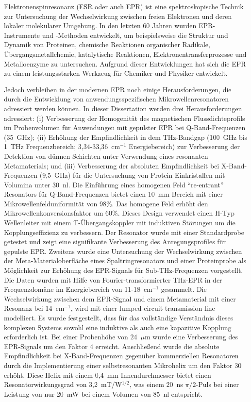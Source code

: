 \vspace{-2em}
Elektronenspinresonanz (ESR oder auch EPR) ist eine spektroskopische Technik zur Untersuchung der Wechselwirkung zwischen freien Elektronen und deren lokaler molekularer Umgebung. In den letzten 60 Jahren wurden EPR-Instrumente und -Methoden entwickelt, um beispielsweise die Struktur und Dynamik von Proteinen, chemische Reaktionen organischer Radikale, Übergangsmetallchemie, katalytische Reaktionen, Elektronentransferprozesse und Metalloenzyme zu untersuchen. Aufgrund dieser Entwicklungen hat sich die EPR zu einem leistungsstarken Werkzeug für Chemiker und Physiker entwickelt.

Jedoch verbleiben in der modernen EPR noch einige Herausforderungen, die durch die Entwicklung von anwendungsspezifischen Mikrowellenresonatoren adressiert werden können. In dieser Dissertation werden drei Herausforderungen adressiert: (i) Verbesserung der Homogenität des magnetischen Flussdichteprofils im Probenvolumen für Anwendungen mit gepulster EPR bei Q-Band-Frequenzen (35~GHz); (ii) Erhöhung der Empfindlichkeit in dem THz-Bandgap (100~GHz bis 1~THz Frequenzbereich; 3{,}34-33{,}36~cm$^{-1}$ Energiebereich) zur Verbesserung der Detektion von dünnen Schichten unter Verwendung eines resonanten Metamaterials; und (iii) Verbesserung der absoluten Empfindlichkeit bei X-Band-Frequenzen (9{,}5~GHz) für die Untersuchung von Protein-Einkristallen mit Volumina unter 30~nl. Die Einführung eines homogenen Feld ``re-entrant'' \cylTE{} Resonators für Q-Band-Frequenzen bietet einen 10~mm Bereich mit einer Mikrowellenfelduniformität von 98\%. Das homogene Feld erhöht den Mikrowellenkonversionsfaktor um 60\%. Dieses Design verwendet einen H-Typ Wellenleiter mit einem T-Übergangskoppler mit induktiven St\"{o}rungen um die Kopplungseffizienz zu verbessern. Der Resonator wurde mit einer Standardprobe getestet und zeigt eine signifikante Verbesserung des Anregungsprofiles für gepulste EPR. Zweitens wurde eine Untersuchung der Wechselwirkung zwischen der Meta-Materialoberfläche eines Spaltringresonators und einer Proteinprobe als Möglichkeit zur Erhöhung des EPR-Signals für Sub-THz-Frequenzen vorgestellt. Die Daten wurden mit Hilfe von Fourier-transformierter THz-EPR in der Frequenzdomäne im Energiebereich von 11-18~cm$^{-1}$ gesammelt.  Die Wechselwirkung zwischen dem EPR-Signal und einem Metamaterial mit einer Resonanz bei 14~cm$^{-1}$, wird mit einer lumped-circuit transmission-line modelliert. Es wurde festgestellt, dass für das vollständige Verständnis dieses komplexen Systems sowohl eine induktive als auch eine kapazitive Kopplung erforderlich ist. Bei einer Probenhöhe von 24~$\mu$m wurde eine Verbesserung des EPR-Signals um den Faktor 4 erreicht. Anschließend wurde die absolute Empfindlichkeit bei X-Band-Frequenzen gegenüber kommerziellen Resonatoren durch die Implementierung einer selbstresonanten Mikrohelix um den Faktor 30 erhöht. Diese Helix mit einem 0{,}4~mm Innendurchmesser bietet einen Resonatorwirkungsgrad von 3{,}2~mT/W$^{1/2}$, was einem 20~ns $\pi/2$-Puls bei einer Leistung von nur 20~mW bei einem Volumen von 85~nl entspricht. %
